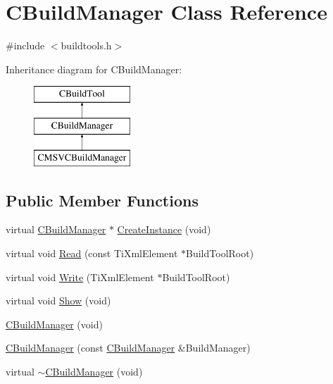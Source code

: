 \hypertarget{classCBuildManager}{\section{C\-Build\-Manager Class Reference}
\label{classCBuildManager}
}


{\ttfamily \#include $<$buildtools.\-h$>$}

Inheritance diagram for C\-Build\-Manager\-:\begin{figure}[H]
\begin{center}
\leavevmode
\includegraphics[height=3.000000cm]{dd/dda/classCBuildManager}
\end{center}
\end{figure}
\subsection*{Public Member Functions}
\begin{DoxyCompactItemize}
\item 
virtual \hyperlink{classCBuildManager}{C\-Build\-Manager} $\ast$ \hyperlink{classCBuildManager_a3613cf27c028cb883a5b309a8c024d75}{Create\-Instance} (void)
\item 
virtual void \hyperlink{classCBuildManager_a3a2dfa7800c44b7122a248d32dffe193}{Read} (const Ti\-Xml\-Element $\ast$Build\-Tool\-Root)
\item 
virtual void \hyperlink{classCBuildManager_a62bfb161da5eacc3b372c220dc89fa0b}{Write} (Ti\-Xml\-Element $\ast$Build\-Tool\-Root)
\item 
virtual void \hyperlink{classCBuildManager_a6a7e968c30cef765316d06a1f0a6d76c}{Show} (void)
\item 
\hyperlink{classCBuildManager_a0cd9e816598b01abb1feb74053ae009d}{C\-Build\-Manager} (void)
\item 
\hyperlink{classCBuildManager_a1cce01b779f158fb141e86be5a1dd53a}{C\-Build\-Manager} (const \hyperlink{classCBuildManager}{C\-Build\-Manager} \&Build\-Manager)
\item 
virtual \hyperlink{classCBuildManager_a5f19b138a427a10eb57911819e5bc6aa}{$\sim$\-C\-Build\-Manager} (void)
\end{DoxyCompactItemize}
